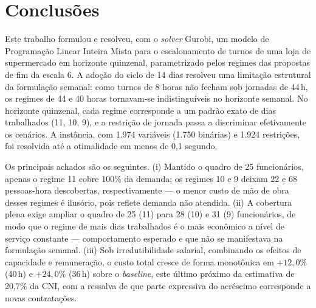 \documentclass[12pt,a4paper]{article}
\begin{document}
\section{Conclusões}
\label{sec:conclusoes}

Este trabalho formulou e resolveu, com o \emph{solver} Gurobi, um modelo de
Programação Linear Inteira Mista para o escalonamento de turnos de uma loja de
supermercado em horizonte quinzenal, parametrizado pelos regimes das propostas
de fim da escala 6. A adoção do ciclo de 14 dias resolveu uma
limitação estrutural da formulação semanal: como turnos de 8 horas não fecham
sob jornadas de 44\,h, os regimes de 44 e 40 horas tornavam-se indistinguíveis
no horizonte semanal. No horizonte quinzenal, cada regime corresponde a um
padrão exato de dias trabalhados (11, 10,
9), e a restrição de jornada passa a discriminar efetivamente os
cenários. A instância, com 1.974 variáveis (1.750 binárias) e 1.924
restrições, foi resolvida até a otimalidade em menos de 0,1 segundo.

Os principais achados são os seguintes. (i) Mantido o quadro de 25
funcionários, apenas o regime 11 cobre 100\% da demanda; os
regimes 10 e 9 deixam 22 e 68 pessoas-hora
descobertas, respectivamente --- o menor custo de mão de obra desses regimes é
ilusório, pois reflete demanda não atendida. (ii) A cobertura plena exige
ampliar o quadro de 25 (11) para 28 (10) e 31
(9) funcionários, de modo que o regime de mais dias trabalhados é
o mais econômico a nível de serviço constante --- comportamento esperado e que
não se manifestava na formulação semanal. (iii) Sob irredutibilidade salarial,
combinando os efeitos de capacidade e remuneração, o custo total cresce de
forma monotônica em $+12{,}0\%$ (40\,h) e $+24{,}0\%$ (36\,h) sobre o
\emph{baseline}, este último próximo da estimativa de 20,7\% da CNI, com a
ressalva de que parte expressiva do acréscimo corresponde a novas
contratações.
\end{document}
